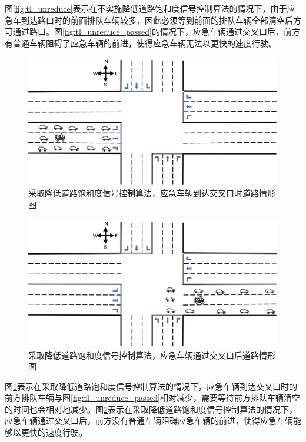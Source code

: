 图\ref{fig:tl_unreduce}表示在不实施降低道路饱和度信号控制算法的情况下，由于应急车到达路口时的前面排队车辆较多，因此必须等到前面的排队车辆全部清空后方可通过路口。图\ref{fig:tl_unreduce_passed}的情况下，应急车辆通过交叉口后，前方有普通车辆阻碍了应急车辆的前进，使得应急车辆无法以更快的速度行驶。

\begin{figure}[H]
	\centering
	\includegraphics[width=\textwidth]{figures/tl_reduce.png}
	\caption{采取降低道路饱和度信号控制算法，应急车辆到达交叉口时道路情形图}
	\label{fig:tl_reduce}
\end{figure}

\begin{figure}[H]
	\centering
	\includegraphics[width=\textwidth]{figures/tl_reduce_passed.png}
	\caption{采取降低道路饱和度信号控制算法，应急车辆通过交叉口后道路情形图}
	\label{fig:tl_reduce_passed}
\end{figure}

图\ref{fig:tl_reduce}表示在采取降低道路饱和度信号控制算法的情况下，应急车辆到达交叉口时的前方排队车辆与图\ref{fig:tl_unreduce_passed}相对减少，需要等待前方排队车辆清空的时间也会相对地减少。图\ref{fig:tl_reduce_passed}表示在采取降低道路饱和度信号控制算法的情况下，应急车辆通过交叉口后，前方没有普通车辆阻碍应急车辆的前进，使得应急车辆能够以更快的速度行驶。

